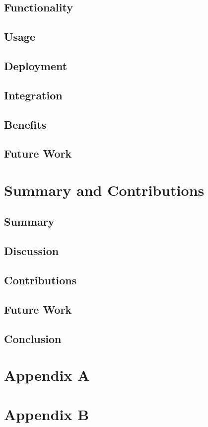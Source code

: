 \documentclass[grad,lot,lof,11pt,oneside,onehalfspace]{RUthesis}
\begin{document}
\section{Functionality}
\section{Usage}
\section{Deployment}
\section{Integration}
\section{Benefits}
\section{Future Work}
\appendix %

\chapter{Summary and Contributions}
\section{Summary}
\section{Discussion}
\section{Contributions}
\section{Future Work}
\section{Conclusion}

\chapter{Appendix A}

\chapter{Appendix B}
\end{document}
